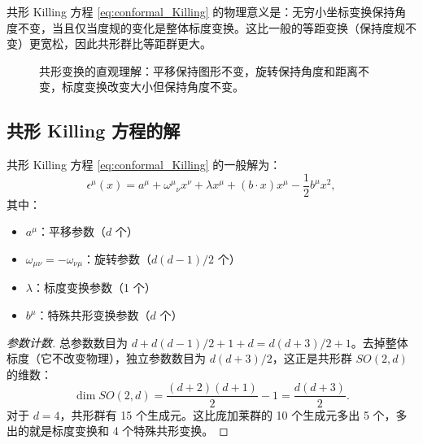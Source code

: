 \begin{remark}
共形 Killing 方程 \eqref{eq:conformal_Killing} 的物理意义是：无穷小坐标变换保持角度不变，当且仅当度规的变化是整体标度变换。这比一般的等距变换（保持度规不变）更宽松，因此共形群比等距群更大。
\end{remark}

\begin{figure}[htbp]
\centering
{}
\caption{共形变换的直观理解：平移保持图形不变，旋转保持角度和距离不变，标度变换改变大小但保持角度不变。}
\label{fig:conformal_transformations}
\end{figure}

\subsection{共形 Killing 方程的解}

\begin{theorem}
共形 Killing 方程 \eqref{eq:conformal_Killing} 的一般解为：
\begin{equation}
    \epsilon^\mu(x) = a^\mu + {\omega^\mu}_\nu x^\nu + \lambda x^\mu + (b \cdot x) x^\mu - \frac{1}{2} b^\mu x^2,
\end{equation}
其中：
\begin{itemize}
    \item $a^\mu$：平移参数（$d$ 个）
    \item $\omega_{\mu\nu} = -\omega_{\nu\mu}$：旋转参数（$d(d-1)/2$ 个）
    \item $\lambda$：标度变换参数（1 个）
    \item $b^\mu$：特殊共形变换参数（$d$ 个）
\end{itemize}
\end{theorem}

\begin{proof}[参数计数]
总参数数目为 $d + d(d-1)/2 + 1 + d = d(d+3)/2 + 1$。去掉整体标度（它不改变物理），独立参数数目为 $d(d+3)/2$，这正是共形群 $SO(2,d)$ 的维数：
\begin{equation}
    \dim SO(2,d) = \frac{(d+2)(d+1)}{2} - 1 = \frac{d(d+3)}{2}.
\end{equation}
对于 $d=4$，共形群有 15 个生成元。这比庞加莱群的 10 个生成元多出 5 个，多出的就是标度变换和 4 个特殊共形变换。
\end{proof}

